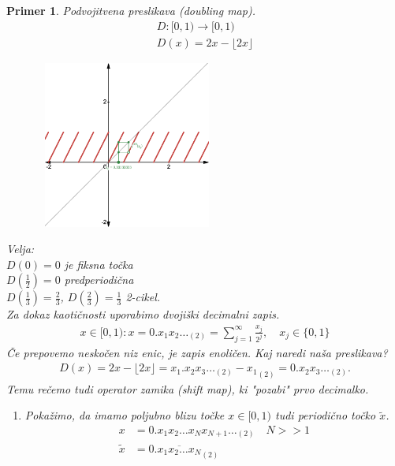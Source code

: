 \documentclass{article}
\newtheorem{primer}{Primer}
\begin{document}
\begin{primer}
Podvojitvena preslikava (doubling map).
\begin{align*}
D:[0, 1) \rightarrow [0, 1) \\ 
D(x) = 2x - \lfloor{2x}\rfloor
\end{align*}
\begin{figure}[h!]
    \begin{centering}
        \includegraphics[width=6cm, height=5.5cm]{Grafi/cobweb7.png}
    \end{centering}
\end{figure}   
\noindent
Velja: \\ 
$D(0) = 0$ je fiksna točka \\ 
$D(\frac{1}{2}) = 0$ predperiodična \\ 
$D(\frac{1}{3}) = \frac{2}{3}$, $D(\frac{2}{3}) = \frac{1}{3}$ 2-cikel.\\
Za dokaz kaotičnosti uporabimo dvojiški decimalni zapis.
\begin{align*}
x\in [0, 1): x = 0.x_1 x_2 \dots_{(2)} = \sum_{j=1}^\infty \frac{x_j}{2^j}, \quad x_j\in \{0, 1\}
\end{align*}
Če prepovemo neskočen niz enic, je zapis enoličen. Kaj naredi naša preslikava?
\begin{align*}
D(x) = 2x - \lfloor 2x \rfloor = x_1.x_2 x_3 \dots_{(2)} - {x_1}_{(2)} = 0.x_2 x_3 \dots_{(2)}.
\end{align*}
Temu rečemo tudi operator zamika (shift map), ki "pozabi" prvo decimalko. 
\begin{enumerate}
\item[(c1)] Pokažimo, da imamo poljubno blizu točke $x\in [0, 1)$ tudi periodično točko $\tilde{x}$.
\begin{align*}
x &= 0.x_1 x_2 \dots x_N x_{N+1} \dots_{(2)} \quad N >> 1 \\ 
\tilde{x} &= 0.\overline{x_1 x_2 \dots x_N}_{(2)}\\

\end{align*}
\end{enumerate}
\end{primer}
\end{document}
